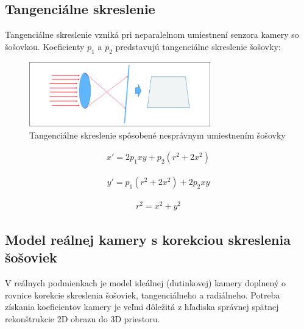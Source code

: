 \subsection{Tangenciálne skreslenie}

Tangenciálne skreslenie vzniká pri neparalelnom umiestnení senzora kamery so šošovkou. Koeficienty $p_1$ a $p_2$ predstavujú tangenciálne skreslenie šošovky:

\begin{figure}[h]
	\centering
	\includegraphics[width=0.7\textwidth]{figures/tangential_distortion.png} 
	\caption{Tangenciálne skreslenie spôsobené nesprávnym umiestnením šošovky}
	\label{fig:tangential_distortion}
\end{figure}

\begin{equation}
\label{eq::tangential_dist::a}
\begin{aligned}
x'= 2p_{1}xy + p_{2}\left(r^{2} + 2x^{2}\right)
\end{aligned}
\end{equation}

\begin{equation}
\label{eq::tangential_dist::b}
\begin{aligned}
y'= p_{1}\left(r^{2} + 2x^{2}\right) + 2p_{2}xy
\end{aligned}
\end{equation}

\begin{equation}
\label{eq::tangential_dist::c}
\begin{aligned}
r^2=x^2+y^2
\end{aligned}
\end{equation}

\subsection{Model reálnej kamery s korekciou skreslenia šošoviek}

V reálnych podmienkach je model ideálnej (dutinkovej) kamery doplnený o rovnice korekcie skreslenia šošoviek, tangenciálneho a radiálneho. Potreba získania koeficientov kamery je veľmi dôležitá z hľadiska správnej spätnej rekonštrukcie 2D obrazu do 3D priestoru.

